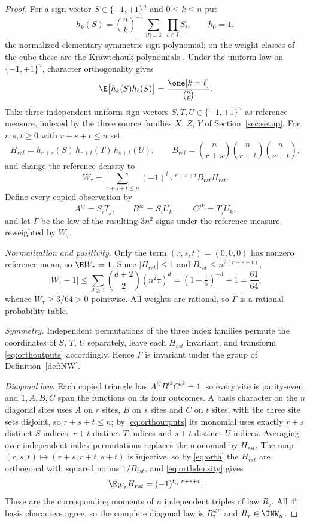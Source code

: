 \begin{proof}
For a sign vector $S\in\{-1,+1\}^n$ and $0\le k\le n$ put
\[
h_k(S)=\binom nk^{-1}\sum_{|I|=k}\ \prod_{i\in I}S_i,\qquad h_0=1 ,
\]
the normalized elementary symmetric sign polynomial; on the weight classes of the cube these are the Krawtchouk polynomials \cite{MacWilliamsSloane1977}. Under the uniform law on $\{-1,+1\}^n$, character orthogonality gives
\begin{equation}\label{eq:orth}
\E\bigl[h_k(S)h_\ell(S)\bigr]=\frac{\one[k=\ell]}{\binom nk}.
\end{equation}
Take three independent uniform sign vectors $S,T,U\in\{-1,+1\}^n$ as reference measure, indexed by the three source families $X$, $Z$, $Y$ of Section~\ref{sec:setup}. For $r,s,t\ge0$ with $r+s+t\le n$ set
\[
H_{rst}=h_{r+s}(S)\,h_{r+t}(T)\,h_{s+t}(U),\qquad
B_{rst}=\binom n{r+s}\binom n{r+t}\binom n{s+t},
\]
and change the reference density to
\begin{equation}\label{eq:orthdensity}
W_\tau=\sum_{r+s+t\le n}(-1)^t\,\tau^{\,r+s+t}B_{rst}H_{rst}.
\end{equation}
Define every copied observation by
\begin{equation}\label{eq:orthoutputs}
A^{ij}=S_iT_j,\qquad B^{ik}=S_iU_k,\qquad C^{jk}=T_jU_k ,
\end{equation}
and let $\Gamma$ be the law of the resulting $3n^2$ signs under the reference measure reweighted by $W_\tau$.

\emph{Normalization and positivity.} Only the term $(r,s,t)=(0,0,0)$ has nonzero reference mean, so $\E W_\tau=1$. Since $|H_{rst}|\le1$ and $B_{rst}\le n^{2(r+s+t)}$,
\[
|W_\tau-1|\le\sum_{d\ge1}\binom{d+2}2(n^2\tau)^d=(1-\tfrac15)^{-3}-1=\frac{61}{64},
\]
whence $W_\tau\ge3/64>0$ pointwise. All weights are rational, so $\Gamma$ is a rational probability table.

\emph{Symmetry.} Independent permutations of the three index families permute the coordinates of $S$, $T$, $U$ separately, leave each $H_{rst}$ invariant, and transform \eqref{eq:orthoutputs} accordingly. Hence $\Gamma$ is invariant under the group of Definition~\ref{def:NW}.

\emph{Diagonal law.} Each copied triangle has $A^{ij}B^{ik}C^{jk}=1$, so every site is parity-even and $1,A,B,C$ span the functions on its four outcomes. A basis character on the $n$ diagonal sites uses $A$ on $r$ sites, $B$ on $s$ sites and $C$ on $t$ sites, with the three site sets disjoint, so $r+s+t\le n$; by \eqref{eq:orthoutputs} its monomial uses exactly $r+s$ distinct $S$-indices, $r+t$ distinct $T$-indices and $s+t$ distinct $U$-indices. Averaging over independent index permutations replaces the monomial by $H_{rst}$. The map $(r,s,t)\mapsto(r+s,r+t,s+t)$ is injective, so by \eqref{eq:orth} the $H_{rst}$ are orthogonal with squared norms $1/B_{rst}$, and \eqref{eq:orthdensity} gives
\begin{equation}\label{eq:orthmoments}
\E_{W_\tau}H_{rst}=(-1)^t\tau^{\,r+s+t}.
\end{equation}
These are the corresponding moments of $n$ independent triples of law $R_\tau$. All $4^n$ basis characters agree, so the complete diagonal law is $R_\tau^{\otimes n}$ and $R_\tau\in\INW_n$.


\end{proof}
